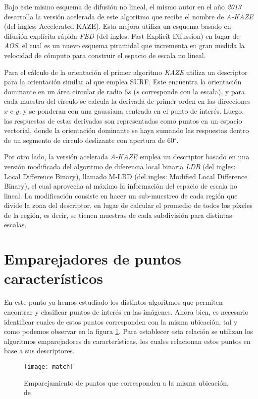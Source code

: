 Bajo este mismo esquema de difusión no lineal, el mismo autor en el año \textit{2013} desarrolla la versión acelerada de este algoritmo que recibe el nombre de \textit{A-KAZE} \cite{akaze} (del ingles: Accelerated KAZE). Esta mejora utiliza un esquema basado en difusión explícita rápida \textit{FED} (del ingles: Fast Explicit Difussion) en lugar de \textit{AOS}, el cual es un nuevo esquema piramidal que incrementa en gran medida la velocidad de cómputo para construir el espacio de escala no lineal.

Para el cálculo de la orientación el primer algoritmo \textit{KAZE} utiliza un descriptor para la orientación similar al que emplea SURF. Este encuentra la orientación dominante en un área circular de radio 6$s$ ($s$ corresponde con la escala), y para cada muestra del círculo se calcula la derivada de primer orden en las direcciones $x$ e $y$, y se ponderan con una gaussiana centrada en el punto de interés. Luego, las respuestas de estas derivadas son representadas como puntos en un espacio vectorial, donde la orientación dominante se haya sumando las respuestas dentro de un segmento de circulo deslizante con apertura de 60$^\circ$.

Por otro lado, la versión acelerada \textit{A-KAZE} emplea un descriptor basado en una versión modificada del algoritmo de diferencia local binaria \textit{LDB} \cite{ldb} (del ingles: Local Difference Binary), llamado M-LBD (del ingles: Modified Local Difference Binary), el cual aprovecha al máximo la información del espacio de escala no lineal. La modificación consiste en hacer un sub-muestreo de cada región que divide la zona del descriptor, en lugar de calcular el promedio de todos los píxeles de la región, es decir, se tienen muestras de cada subdivisión para distintas escalas.


\section{Emparejadores de puntos característicos}

En este punto ya hemos estudiado los distintos algoritmos que permiten encontrar y clasificar puntos de interés en las imágenes. Ahora bien, es necesario identificar cuales de estos puntos corresponden con la misma ubicación, tal y como podemos observar en la figura \ref*{imagen:match}. Para establecer esta relación se utilizan los algoritmos emparejadores de características, los cuales relacionan estos puntos en base a sus descriptores.

\begin{figure}[H]
	\centering
	\texttt{[image: match]}
	\caption[Emparejamiento de puntos característicos]{Emparejamiento de puntos que corresponden a la misma ubicación, de \cite{comp-vision} }
	\label{imagen:match}
\end{figure}

